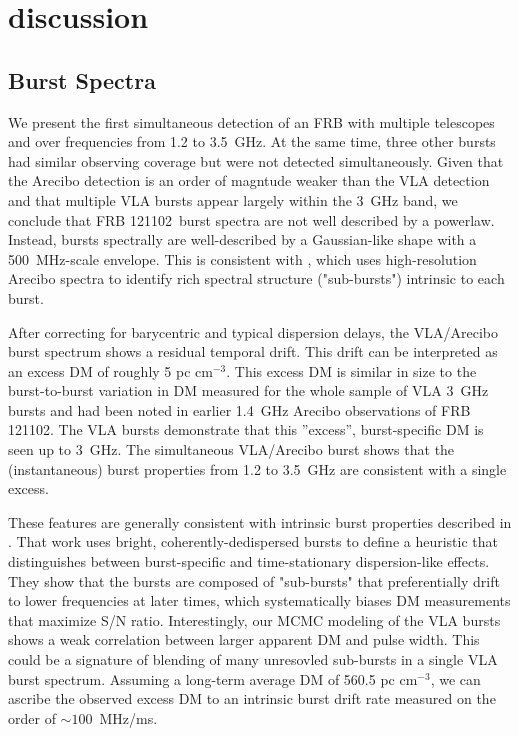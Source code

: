 \documentclass[twocolumn]{aastex61}
\newcommand{\frb}{FRB 121102}
\begin{document}
\section{discussion}
\label{sec:disc}
\subsection{Burst Spectra}
We present the first simultaneous detection of an FRB with multiple telescopes and over frequencies from 1.2 to 3.5~GHz. At the same time, three other bursts had similar observing coverage but were not detected simultaneously. Given that the Arecibo detection is an order of magntude weaker than the VLA detection and that multiple VLA bursts appear largely within the 3~GHz band, we conclude that \frb\ burst spectra are not well described by a powerlaw. Instead, bursts spectrally are well-described by a Gaussian-like shape with a 500~MHz-scale envelope. This is consistent with \citet{WEIRD}, which uses high-resolution Arecibo spectra to identify rich spectral structure ("sub-bursts") intrinsic to each burst.

After correcting for barycentric and typical dispersion delays, the VLA/Arecibo burst spectrum shows a residual temporal drift. This drift can be interpreted as an excess DM of roughly 5 pc cm$^{-3}$. This excess DM is similar in size to the burst-to-burst variation in DM measured for the whole sample of VLA 3~GHz bursts and had been noted in earlier 1.4~GHz Arecibo observations of \frb \citep{2016arXiv160308880S}. The VLA bursts demonstrate that this ''excess'', burst-specific DM is seen up to 3~GHz. The simultaneous VLA/Arecibo burst shows that the (instantaneous) burst properties from 1.2 to 3.5~GHz are consistent with a single excess. 

These features are generally consistent with intrinsic burst properties described in \citet{WEIRD}. That work uses bright, coherently-dedispersed bursts to define a heuristic that distinguishes between burst-specific and time-stationary dispersion-like effects. They show that the bursts are composed of "sub-bursts" that preferentially drift to lower frequencies at later times, which systematically biases DM measurements that maximize S/N ratio. Interestingly, our MCMC modeling of the VLA bursts shows a weak correlation between larger apparent DM and pulse width. This could be a signature of blending of many unresovled sub-bursts in a single VLA burst spectrum. Assuming a long-term average DM of 560.5 pc cm$^{-3}$, we can ascribe the observed excess DM to an intrinsic burst drift rate measured on the order of $\sim100$~MHz/ms.
\end{document}
